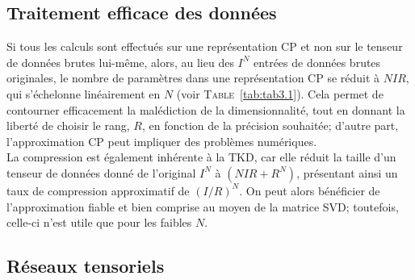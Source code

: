 \documentclass[11pt,a4paper,oneside]{book}
\newcommand{\tabref}[1]{\textsc{Table}~\ref{#1}}
\begin{document}
\subsection{Traitement efficace des données}
Si tous les calculs sont effectués sur une représentation CP et non sur le tenseur de données brutes lui-même, alors, au lieu des $ I^{N} $ entrées de données brutes originales, le nombre de paramètres dans une représentation CP se réduit à $ NIR $, qui s'échelonne linéairement en $ N $ (voir \tabref{tab:tab3.1}). Cela permet de contourner efficacement la malédiction de la dimensionnalité, tout en donnant la liberté de choisir le rang, $ R $, en fonction de la précision souhaitée; d'autre part, l'approximation CP peut impliquer des problèmes numériques.\\
La compression est également inhérente à la TKD, car elle réduit la taille d'un tenseur de données donné de l'original $ I^{N} $ à $ (NIR + R^{N}) $, présentant ainsi un taux de compression approximatif de $ (I/R)^{N} $. On peut alors bénéficier de l'approximation fiable et bien comprise au moyen de la matrice SVD; toutefois, celle-ci n'est utile que pour les faibles $ N $.
\subsection{Réseaux tensoriels}
\end{document}
